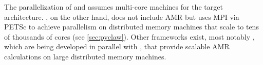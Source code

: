 The parallelization of \amrclaw and \geoclaw assumes multi-core machines for the
target architecture.  \pyclaw, on the other hand, does not include AMR but uses
MPI via PETSc to achieve parallelism on distributed memory machines that scale
to tens of thousands of cores (see \cref{sec:pyclaw}). Other frameworks exist,
most notably \forestclaw \cite{Burstedde:we}, which are being developed in
parallel with \amrclaw, that provide scalable AMR calculations on large
distributed
memory machines.

